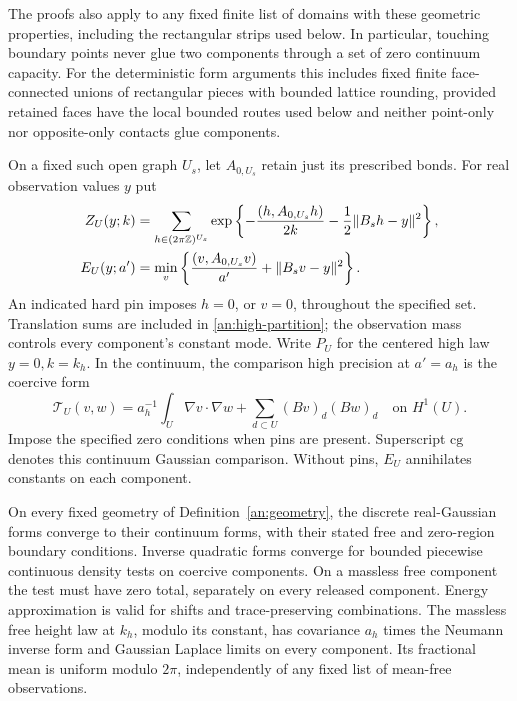 The proofs also apply to any fixed finite list of domains with
these geometric properties, including the rectangular strips
used below.  In particular, touching boundary points never
glue two components through a set of zero continuum capacity.
For the deterministic form arguments this includes fixed finite
face-connected unions of rectangular pieces with bounded lattice
rounding, provided retained faces have the local bounded routes
used below and neither point-only nor opposite-only contacts glue
components.

On a fixed such open graph $U_s$, let $A_{0,U_s}$ retain just
its prescribed bonds.  For real observation values $y$ put
\begin{align}
 Z_U(y;k)&=\sum_{h\in(2\pi\mathbb Z)^{U_s}}
  \exp\left\{-\frac{(h,A_{0,U_s}h)}{2k}
                    -\frac12\|B_sh-y\|^2\right\},
 \label{an:high-partition}\\
 E_U(y;a')&=\min_v\left\{
       \frac{(v,A_{0,U_s}v)}{a'}+\|B_sv-y\|^2\right\}.
 \label{an:comparison-energy}
\end{align}
An indicated hard pin imposes $h=0$, or $v=0$, throughout
the specified set.  Translation sums are included in
\eqref{an:high-partition}; the observation mass controls
every component's constant mode.  Write $P_U$ for the
centered high law $y=0,k=k_h$.  In the continuum, the
comparison high precision at $a'=a_h$ is the coercive form
\begin{equation}
 \mathcal T_U(v,w)=a_h^{-1}\int_U\nabla v\cdot\nabla w
                             +\sum_{d\subset U}(Bv)_d(Bw)_d
 \quad\text{on }H^1(U).
 \label{an:continuum-high-form}
\end{equation}
Impose the specified zero conditions when pins are present.
Superscript $\mathrm{cg}$ denotes this continuum Gaussian
comparison.  Without pins, $E_U$ annihilates constants on
each component.

\begin{lemma}\label{an:forms}
On every fixed geometry of Definition~\ref{an:geometry},
the discrete real-Gaussian forms converge to their continuum
forms, with their stated free and zero-region boundary
conditions.  Inverse quadratic forms converge for bounded
piecewise continuous density tests on coercive components.  On a
massless free component the test must have zero total, separately
on every released component.  Energy approximation is valid for
shifts and trace-preserving combinations.
The massless free height law at $k_h$, modulo its constant,
has covariance $a_h$ times the Neumann inverse form and
Gaussian Laplace limits on every component.  Its fractional
mean is uniform modulo $2\pi$, independently of any fixed
list of mean-free observations.
\end{lemma}

